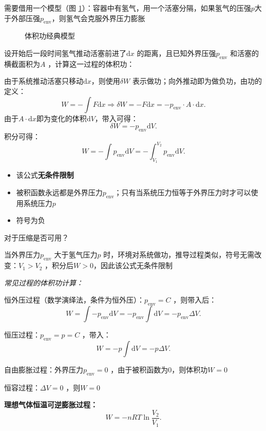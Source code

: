 需要借用一个模型（图 \ref{fig:体积功经典模型}）：容器中有氢气，用一个活塞分隔，如果氢气的压强$p$大于外部压强$p_\text{env}$，则氢气会克服外界压力膨胀
\begin{figure}[ht!]
    \centering
    \caption{体积功经典模型}
    \label{fig:体积功经典模型}
\end{figure}

设开始后一段时间氢气推动活塞前进了$\mathrm{d}x$ 的距离，且已知外界压强$p_\text{env}$ 和活塞的横截面积为$A$ ，计算这一过程的体积功：
\begin{sol}
    由于系统推动活塞只移动$\mathrm{d}x$，则使用$\delta W$ 表示做功；向外推动即为做负功，由功的定义：
    \[
        W = -\int F\mathrm{d}x \Rightarrow \delta W = -F\mathrm{d}x = -p_\text{env}\cdot A\cdot \mathrm{d}x
    .\]
    由于$A \cdot \mathrm{d}x$即为变化的体积$\mathrm{d}V$，带入可得： \[
        \delta W = -p_\text{env}\mathrm{d}V
    .\]
    积分可得：\[
        \boxed{W = -\int p_\text{env}\mathrm{d}V = -\int_{V_1}^{V_2} p_\text{env} \mathrm{d}V
    .}\]
\end{sol}
\begin{notation}
    \begin{itemize}
        \item 该公式\textbf{无条件限制}
        \item 被积函数永远都是外界压力$p_\text{env}$；只有当系统压力恒等于外界压力时才可以使用系统压力$p$
        \item 符号为负
    \end{itemize}
\end{notation}
\begin{question}
    对于压缩是否可用？
\end{question}
当外界压力$p_\text{env}$ 大于氢气压力$p$ 时，环境对系统做功，推导过程类似，符号无需改变：$V_1>V_2$ ，积分后$W>0$，因此该公式无条件限制

\textit{常见过程的体积功计算：}
\begin{notation}
    恒外压过程（数学演绎法，条件为恒外压）：$p_\text{env}=C$ ，则带入后：\[
        W=\int-p_\text{env}\mathrm{d}V = -p_\text{env}\int \mathrm{d}V = -p_\text{env}\Delta V
    .\]

    恒压过程：$p_\text{env}=p=C$ ，带入：\[
        W = -p \int \mathrm{d}V = -p\Delta V
    .\]

    自由膨胀过程：外界压力$p_\text{env}=0$ ，由于被积函数为0，则体积功$W=0$ 

    恒容过程：$\Delta V=0$ ，则$W = 0$

    \textbf{理想气体恒温可逆膨胀过程：}\[
        W = -nRT \ln \frac{V_2}{V_1}
    .\]
\end{notation}
